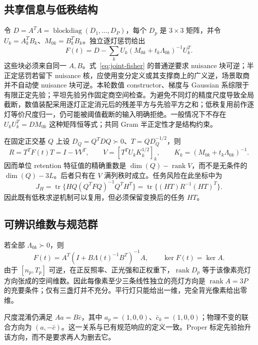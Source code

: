 \subsection{共享信息与低秩结构}
令 $D=A^TA=\operatorname{blockdiag}(D_1,\ldots,D_P)$，每个 $D_p$ 是 $3\times3$ 矩阵，并令 $U_k=A_k^TB_k$、$M_{0k}=B_k^TB_k$。独立逐灯惩罚给出
\begin{equation}
 F(t)=D-\sum_kU_k(M_{0k}+t_k\Lambda_{0k})^{-1}U_k^T.
 \label{eq:joint-fisher}
\end{equation}
这些块必须来自同一 $A,B$。式~\eqref{eq:joint-fisher} 的普通逆要求 nuisance 块可逆；半正定惩罚若留下 nuisance 核，应使用变分定义或其支撑商上的广义逆，场景取商并不自动使 nuisance 块可逆。本轮数值 constructor、梯度与 Gaussian 系综限于有限正定先验；平坦先验另作固定商空间检查。为避免不同灯的精度尺度导致全局截断，数值装配采用逐灯正定消元后的残差平方与先验平方之和；低秩复用前作逐灯等价尺度归一，仍可能被阈值截断的输入明确拒绝。一般情况下不存在 $U_kU_k^T=DM_{0k}$ 这种矩阵恒等式；共同 Gram 半正定性才是结构约束。

在固定正交基 $Q$ 上设 $D_Q=Q^TDQ\succ0$、$T=QD_Q^{-1/2}$，则
\begin{equation}
 R=T^TF(t)T=I-VV^T,\qquad
 V=[T^TU_kK_k^{1/2}]_k,
 \qquad K_k=(M_{0k}+t_k\Lambda_{0k})^{-1}.
\end{equation}
因而单位 retention 特征值的精确重数是 $\dim(Q)-\operatorname{rank}V$，而不是无条件的 $\dim(Q)-3L$。后者只有在 $V$ 满列秩时成立。任务风险在此坐标中为
\begin{equation}
 J_H=\operatorname{tr}\{H Q(Q^TFQ)^{-1}Q^TH^T\}
     =\operatorname{tr}\{(HT)R^{-1}(HT)^T\}.
\end{equation}
因此既有低秩求逆机制可以复用，但必须保留变换后的任务 $HT$。

\subsection{可辨识维数与规范群}

若全部 $\Lambda_{0k}\succ0$，则
\begin{equation}
 F(t)=A^T(I+B\Lambda(t)^{-1}B^T)^{-1}A,
 \qquad \ker F(t)=\ker A.
\end{equation}
由于 $[n_p,T_p]$ 可逆，在正反照率、正光强和正权重下，$\operatorname{rank}D_p$ 等于该像素亮灯方向张成的空间维数。因此每像素至少三条线性独立的亮灯方向是 $\operatorname{rank}A=3P$ 的充要条件；仅有三盏灯并不充分。平行灯只能给出一维，完全背光像素给出零维。

尺度混淆仍满足 $Aa=B\bar c$，其中 $a_p=(1,0,0)$、$\bar c_k=(1,0,0)$；物理不变的联合方向为 $(a,-\bar c)$。这一关系与已有规范响应的定义一致。Proper 标定先验抬升该方向，而不是要求再人为删去它。

